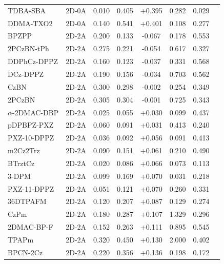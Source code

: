 \begin{longtable}{llcccccc}
TDBA-SBA & 2D-0A & 0.010 & 0.405 & +0.395 & 0.282 & 0.029 & \cite{doi101016jcej2021133598} \\
DDMA-TXO2 & 2D-0A & 0.140 & 0.541 & +0.401 & 0.108 & 0.277 & \cite{doi101039D0QM00429D} \\
BPZPP & 2D-2A & 0.200 & 0.133 & -0.067 & 0.178 & 0.553 & \cite{doi101016jdyepig2022110801} \\
2PCzBN-tPh & 2D-2A & 0.275 & 0.221 & -0.054 & 0.617 & 0.327 & \cite{doi101016jchempr202202017} \\
DDPhCz-DPPZ & 2D-2A & 0.160 & 0.123 & -0.037 & 0.331 & 0.568 & \cite{doi101016jdyepig2022110634} \\
DCz-DPPZ & 2D-2A & 0.190 & 0.156 & -0.034 & 0.703 & 0.562 & \cite{doi101016jdyepig2022110634} \\
CzBN & 2D-2A & 0.300 & 0.298 & -0.002 & 0.254 & 0.349 & \cite{doi101039C5SC04755B} \\
2PCzBN & 2D-2A & 0.305 & 0.304 & -0.001 & 0.725 & 0.343 & \cite{doi101016jchempr202202017} \\
$\alpha$-2DMAC-DBP & 2D-2A & 0.025 & 0.055 & +0.030 & 0.099 & 0.437 & \cite{doi101016jdyepig2021109580} \\
pDPBPZ-PXZ & 2D-2A & 0.060 & 0.091 & +0.031 & 0.413 & 0.240 & \cite{doi101016jcej2022135775} \\
PXZ-10-DPPZ & 2D-2A & 0.036 & 0.092 & +0.056 & 0.091 & 0.413 & \cite{doi101039D0TC01995J} \\
m2Cz2Trz & 2D-2A & 0.090 & 0.151 & +0.061 & 0.210 & 0.490 & \cite{doi101016jdyepig201712048} \\
BTrztCz & 2D-2A & 0.020 & 0.086 & +0.066 & 0.073 & 0.113 & \cite{doi101016jdyepig201809072} \\
3-DPM & 2D-2A & 0.099 & 0.169 & +0.070 & 0.031 & 0.218 & \cite{doi101016jdyepig201701010} \\
PXZ-11-DPPZ & 2D-2A & 0.051 & 0.121 & +0.070 & 0.260 & 0.331 & \cite{doi101039D0TC01995J} \\
36DTPAFM & 2D-2A & 0.120 & 0.207 & +0.087 & 0.129 & 0.274 & \cite{doi101016jorgel2022106645} \\
CzPm & 2D-2A & 0.180 & 0.287 & +0.107 & 1.329 & 0.296 & \cite{doi101039D2TC01326F} \\
2DMAC-BP-F & 2D-2A & 0.152 & 0.263 & +0.111 & 0.895 & 0.545 & \cite{doi101039D1TC04918F} \\
TPAPm & 2D-2A & 0.320 & 0.450 & +0.130 & 2.000 & 0.402 & \cite{doi101016jmtchem2022100955} \\
BPCN-2Cz & 2D-2A & 0.220 & 0.356 & +0.136 & 0.198 & 0.172 & \cite{doi101016jorgel2020105660} \\

\end{longtable}
